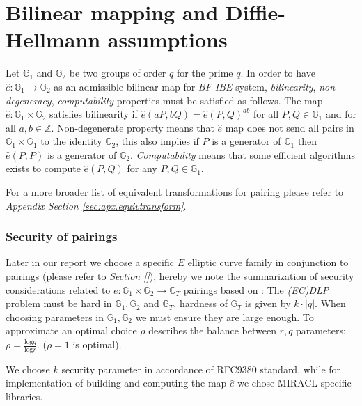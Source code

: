 
\section{Bilinear mapping and Diffie-Hellmann assumptions}
\label{ssec:bilinear.bdh}

Let $\mathbb{G}_1$ and $\mathbb{G}_2$ be two groups of order $q$ for the prime $q$. In order to have $\hat{e}: \mathbb{G}_1 \rightarrow \mathbb{G}_2$ as an admissible bilinear map for \textit{BF-IBE} system, \textit{bilinearity}, \textit{non-degeneracy}, \textit{computability} properties must be satisfied as follows. The map $\hat{e}:\mathbb{G}_1 \times \mathbb{G}_2$ satisfies bilinearity if $\hat{e}(aP, bQ) = \hat{e}(P,Q)^{ab}$ for all $P,Q \in \mathbb{G}_1$ and for all $a,b \in \mathbb{Z}$.
Non-degenerate property means that $\hat{e}$ map does not send all pairs in $\mathbb{G}_1 \times \mathbb{G}_1$ to the identity $\mathbb{G}_2$, this also implies if $P$ is a generator of $\mathbb{G}_1$ then $\hat{e}(P,P)$ is a generator of $\mathbb{G}_2$. \textit{Computability} means that some efficient algorithms exists to compute $\hat{e}(P,Q)$ for any $P,Q\in \mathbb{G}_1$. \cite{BF01}

For a more broader list of equivalent transformations for pairing please refer to \textit{Appendix Section \ref{sec:apx.equivtransform}}. 

\subsubsection{Security of pairings}
\label{ssec:apx.ecc.curves.pairings.security}

Later in our report we choose a specific $E$ elliptic curve family in conjunction to pairings (please refer to \textit{Section \ref{}}), hereby we note the summarization of security considerations related to $e: \mathbb{G}_1 \times \mathbb{G}_2 \rightarrow \mathbb{G}_T$ pairings based on \cite{ecc.fam.param}: The \textit{(EC)DLP} problem must be hard in $\mathbb{G}_1, \mathbb{G}_2$ and $\mathbb{G}_T$, hardness of $\mathbb{G}_T$ is given by $k \cdot \lvert q \rvert$. When choosing parameters in $\mathbb{G}_1, \mathbb{G}_2$ we must ensure they are large enough. To approximate an optimal choice $\rho$ describes the balance between $r,q$ parameters: $\rho = \frac{\mathrm{log} q}{\mathrm{log} r}$. ($\rho = 1$ is optimal). 

We choose $k$ security parameter in accordance of RFC9380\cite{ecc.hashing} standard, while for implementation of building and computing the map $\hat{e}$ we chose MIRACL\cite{lib.miracl} specific libraries.  

